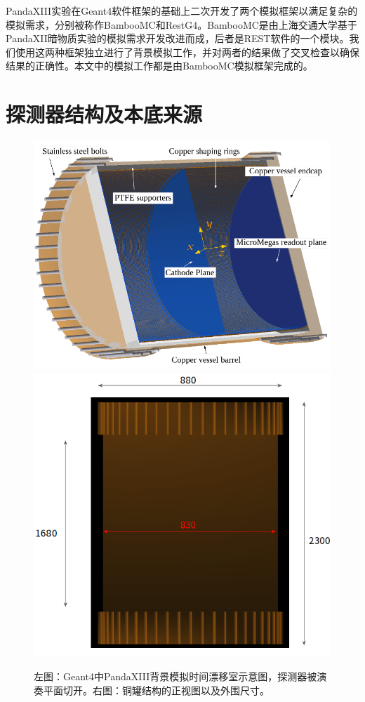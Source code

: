 PandaXIII实验在Geant4软件框架的基础上二次开发了两个模拟框架以满足复杂的模拟需求，分别被称作BambooMC和RestG4。BambooMC是由上海交通大学基于
PandaXII暗物质实验的模拟需求开发改进而成，后者是REST软件\supercite{tomas2013development}的一个模块。我们使用这两种框架独立进行了背景模拟工作，并对两者的结果做了交叉检查以确保结果的正确性。本文中的模拟工作都是由BambooMC模拟框架完成的。

\section{探测器结构及本底来源}
\begin{figure}[tbh]
    \centering
    \includegraphics[width=0.4\columnwidth]{pic/fig3.png}
    \includegraphics[width=0.4\columnwidth]{pic/fig5.png}
    \caption{左图：Geant4中PandaXIII背景模拟时间漂移室示意图\supercite{cnn}，探测器被演奏平面切开。右图：铜罐结构的正视图以及外围尺寸。}
    \label{fig:detector_bamboomc}
\end{figure}

